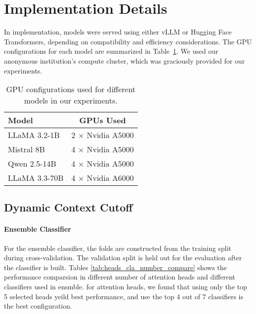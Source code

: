 \section{Implementation Details}
\label{app:details}
In implementation, models were served using either vLLM or Hugging Face Transformers, depending on compatibility and efficiency considerations. The GPU configurations for each model are summarized in Table~\ref{tab:gpu_config}. We used our anonymous institution’s compute cluster, which was graciously provided for our experiments.

\begin{table}[H]
    \centering
    \small
    \begin{tabular}{l c}
        \toprule
        \textbf{Model} & \textbf{GPUs Used} \\
        \midrule
        LLaMA 3.2-1B   & 2 × Nvidia A5000 \\
        Mistral 8B     & 4 × Nvidia A5000 \\
        Qwen 2.5-14B   & 4 × Nvidia A5000 \\
        LLaMA 3.3-70B  & 4 × Nvidia A6000 \\
        \bottomrule
    \end{tabular}
    \caption{GPU configurations used for different models in our experiments.}
    \label{tab:gpu_config}
\end{table}

\subsection{Dynamic Context Cutoff}
\label{app:details:dynamic_context_cutoff}
\paragraph{Ensemble Classifier}
\label{app:details:classifier} 
For the ensemble classifier, the folds are constructed from the training split during cross-validation. The validation split is held out for the evaluation after the classifier is built. Tables \ref{tab:heads_cla_number_compare} shows the performance comparsion in different number of attention heads and different classifiers used in ensmble. for attention heads, we found that using only the top 5 selected heads yeild best performance, and use the top 4 out of 7 classifiers is the best configuration. 

